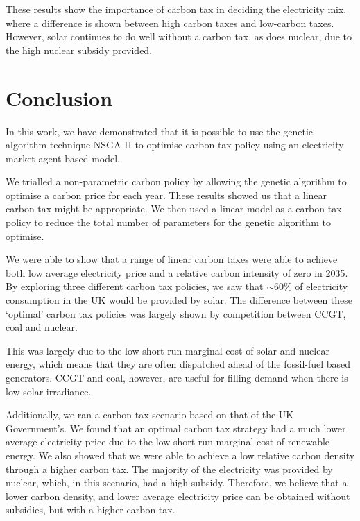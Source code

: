 These results show the importance of carbon tax in deciding the electricity mix, where a difference is shown between high carbon taxes and low-carbon taxes. However, solar continues to do well without a carbon tax, as does nuclear, due to the high nuclear subsidy provided. 




\section{Conclusion}
\label{carbonoptim:sec:conclusion}



In this work, we have demonstrated that it is possible to use the genetic algorithm technique NSGA-II to optimise carbon tax policy using an electricity market agent-based model. 

We trialled a non-parametric carbon policy by allowing the genetic algorithm to optimise a carbon price for each year. These results showed us that a linear carbon tax might be appropriate. We then used a linear model as a carbon tax policy to reduce the total number of parameters for the genetic algorithm to optimise.  

We were able to show that a range of linear carbon taxes were able to achieve both low average electricity price and a relative carbon intensity of zero in 2035. By exploring three different carbon tax policies, we saw that ${\sim}$60\% of electricity consumption in the UK would be provided by solar. The difference between these `optimal' carbon tax policies was largely shown by competition between CCGT, coal and nuclear.

This was largely due to the low short-run marginal cost of solar and nuclear energy, which means that they are often dispatched ahead of the fossil-fuel based generators. CCGT and coal, however, are useful for filling demand when there is low solar irradiance.

Additionally, we ran a carbon tax scenario based on that of the UK Government's. We found that an optimal carbon tax strategy had a much lower average electricity price due to the low short-run marginal cost of renewable energy. We also showed that we were able to achieve a low relative carbon density through a higher carbon tax. The majority of the electricity was provided by nuclear, which, in this scenario, had a high subsidy. Therefore, we believe that a lower carbon density, and lower average electricity price can be obtained without subsidies, but with a higher carbon tax. 


